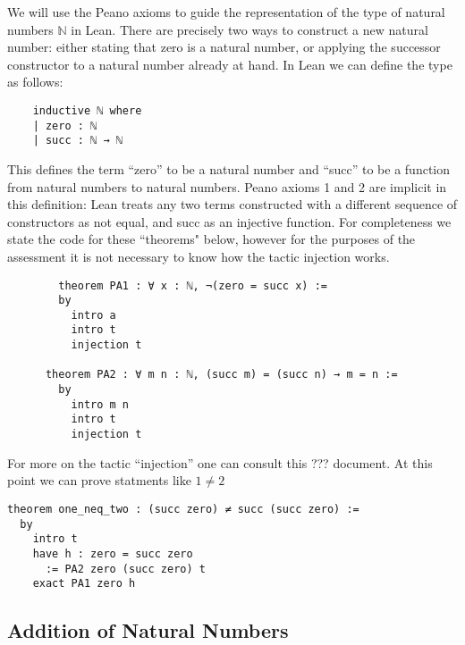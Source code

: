 \documentclass{book}
\begin{document}
We will use the Peano axioms to guide the representation of the type of natural numbers $\mathbb{N}$ in Lean. There are precisely two ways to construct a new natural number: either stating that zero is a natural number, or applying the successor constructor to a natural number already at hand. In Lean we can define the type as follows: 

\begin{center}
    \begin{lstlisting}
    inductive ℕ where
    | zero : ℕ
    | succ : ℕ → ℕ
    \end{lstlisting}
\end{center}

This defines the term ``zero'' to be a natural number and ``succ'' to be a function from natural numbers to natural numbers. Peano axioms 1 and 2 are implicit in this definition: Lean treats any two terms constructed with a different sequence of constructors as not equal, and succ as an injective function. For completeness we state the code for these ``theorems" below, however for the purposes of the assessment it is not necessary to know how the tactic injection works.

\begin{center}
    \begin{lstlisting}
        theorem PA1 : ∀ x : ℕ, ¬(zero = succ x) :=
        by
          intro a
          intro t
          injection t
      
      theorem PA2 : ∀ m n : ℕ, (succ m) = (succ n) → m = n :=
        by
          intro m n
          intro t
          injection t
    \end{lstlisting}
\end{center}

For more on the tactic ``injection'' one can consult this ??? document. At this point we can prove statments like $1 \neq 2$ 

\begin{center}
    \begin{lstlisting}
theorem one_neq_two : (succ zero) ≠ succ (succ zero) :=
  by
    intro t
    have h : zero = succ zero
      := PA2 zero (succ zero) t
    exact PA1 zero h
    \end{lstlisting}
\end{center}

\subsection*{Addition of Natural Numbers}
\end{document}
